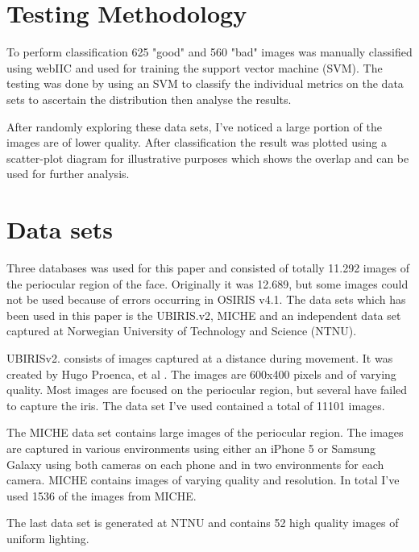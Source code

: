 
\section{Testing Methodology}\label{sec:test}
To perform classification 625 "good" and 560 "bad" images was manually
classified using webIIC \cite{webiic} and used for training the support vector
machine (SVM). The testing was done by using an SVM to classify the individual
metrics on the data sets to ascertain the distribution then analyse the results.

After randomly exploring these data sets, I've noticed a large portion of the
images are of lower quality. After classification the result was plotted using a
scatter-plot diagram for illustrative purposes which shows the overlap and can
be used for further analysis.




\section{Data sets}\label{sec:dataset}
Three databases was used for this paper and consisted of totally 11.292 images
of the periocular region of the face.  Originally it was 12.689, but some images
could not be used because of errors occurring in OSIRIS v4.1\cite{osiris}.
The data sets which has been used in this paper is the UBIRIS.v2\cite{ubiris},
MICHE\cite{miche} and an independent data set captured at Norwegian University of
Technology and Science (NTNU).

UBIRISv2. consists of images captured at a distance during movement. It was 
created by Hugo Proenca, et al \cite{ubiris}. The images are 600x400 pixels and
of varying quality. Most images are focused on the periocular region, but
several have failed to capture the iris.  The data set I've used contained a
total of 11101 images.

The MICHE\cite{miche} data set contains large images of the periocular region. 
The images are captured in various environments using either an iPhone 5 or 
Samsung Galaxy using both cameras on each phone and in two environments for each
camera. MICHE contains images of varying quality and resolution. In total I've
used 1536 of the images from MICHE.

The last data set is generated at NTNU and contains 52 high quality images of
uniform lighting.

